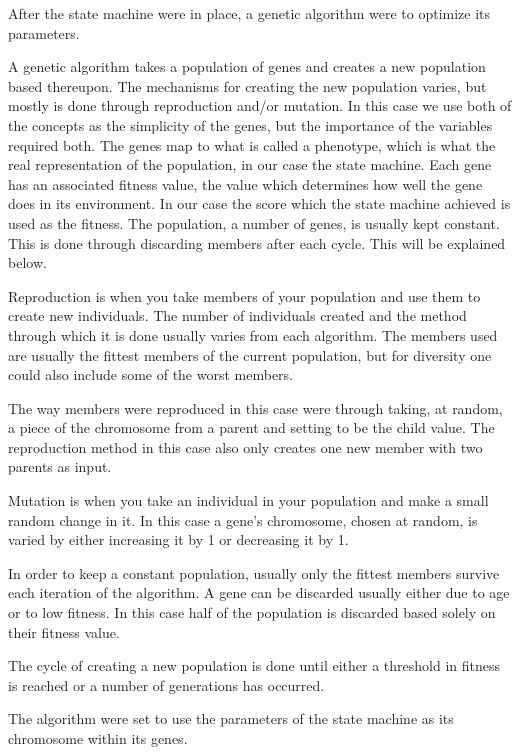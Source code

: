 \documentclass[conference,compsoc]{IEEEtran}
\begin{document}
After the state machine were in place, a genetic algorithm were to optimize its parameters.

A genetic algorithm takes a population of genes and creates a new population based thereupon. The mechanisms for creating the new population varies, but mostly is done through reproduction and/or mutation. In this case we use both of the concepts as the simplicity of the genes, but the importance of the variables required both.
The genes map to what is called a phenotype, which is what the real representation of the population, in our case the state machine. 
Each gene has an associated fitness value, the value which determines how well the gene does in its environment. In our case the score which the state machine achieved is used as the fitness. 
The population, a number of genes, is usually kept constant. This is done through discarding members after each cycle. This will be explained below.

Reproduction is when you take members of your population and use them to create new individuals. The number of individuals created and the method through which it is done usually varies from each algorithm. The members used are usually the fittest members of the current population, but for diversity one could also include some of the worst members. 

The way members were reproduced in this case were through taking, at random, a piece of the chromosome from a parent and setting to be the child value. The reproduction method in this case also only creates one new member with two parents as input. 

Mutation is when you take an individual in your population and make a small random change in it. In this case a gene's chromosome, chosen at random, is varied by either increasing it by 1 or decreasing it by 1. 

In order to keep a constant population, usually only the fittest members survive each iteration of the algorithm. A gene can be discarded usually either due to age or to low fitness. In this case half of the population is discarded based solely on their fitness value.

The cycle of creating a new population is done until either a threshold in fitness is reached or a number of generations has occurred.

The algorithm were set to use the parameters of the state machine as its chromosome within its genes. 
\end{document}
